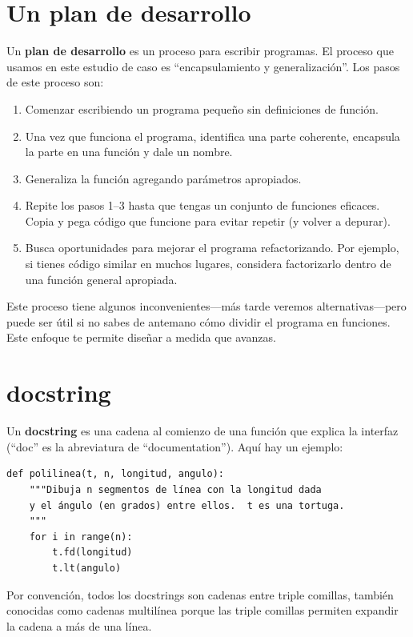 \documentclass[10pt]{book}
\begin{document}
\section{Un plan de desarrollo}

Un {\bf plan de desarrollo} es un proceso para escribir programas.  El
proceso que usamos en este estudio de caso es ``encapsulamiento y
generalización''.  Los pasos de este proceso son:

\begin{enumerate}

\item Comenzar escribiendo un programa pequeño sin definiciones de función.

\item Una vez que funciona el programa, identifica una parte
  coherente, encapsula la parte en una función y dale un nombre.

\item Generaliza la función agregando parámetros apropiados.

\item Repite los pasos 1--3 hasta que tengas un conjunto de funciones eficaces.
Copia y pega código que funcione para evitar repetir (y volver a depurar).

\item Busca oportunidades para mejorar el programa refactorizando.
Por ejemplo, si tienes código similar en muchos lugares, considera
factorizarlo dentro de una función general apropiada.

\end{enumerate}

Este proceso tiene algunos inconvenientes---más tarde veremos alternativas---pero
puede ser útil si no sabes de antemano cómo dividir el
programa en funciones.  Este enfoque te permite diseñar a medida que
avanzas.


\section{docstring}
\label{docstring}

Un {\bf docstring} es una cadena al comienzo de una función que
explica la interfaz (``doc'' es la abreviatura de ``documentation'').  Aquí
hay un ejemplo:

\begin{verbatim}
def polilinea(t, n, longitud, angulo):
    """Dibuja n segmentos de línea con la longitud dada
    y el ángulo (en grados) entre ellos.  t es una tortuga.
    """
    for i in range(n):
        t.fd(longitud)
        t.lt(angulo)
\end{verbatim}
%
Por convención, todos los docstrings son cadenas entre triple comillas, también conocidas
como cadenas multilínea porque las triple comillas permiten expandir
la cadena a más de una línea.
\end{document}
